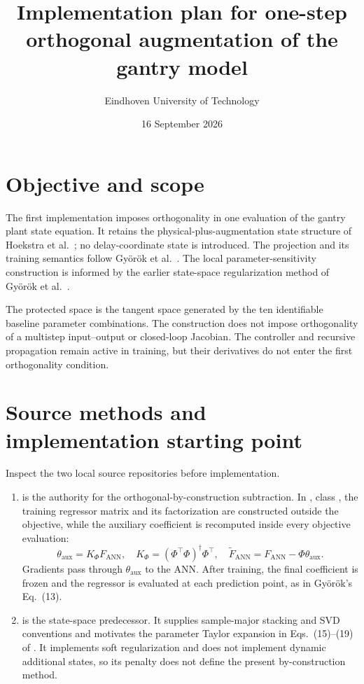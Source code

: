 \documentclass[11pt,a4paper]{article}
\title{Implementation plan for one-step orthogonal augmentation of the gantry model}
\author{Eindhoven University of Technology}
\date{16 September 2026}
\begin{document}
\maketitle

\section{Objective and scope}

The first implementation imposes orthogonality in one evaluation of the
gantry plant state equation. It retains the physical-plus-augmentation state
structure of Hoekstra et al.~\cite{hoekstra2025lfr,hoekstra2026fp}; no
delay-coordinate state is introduced. The projection and its training
semantics follow Gy\"or\"ok et al.~\cite{gyorok2026obc}. The local
parameter-sensitivity construction is informed by the earlier state-space
regularization method of Gy\"or\"ok et al.~\cite{gyorok2025l4dc}.

The protected space is the tangent space generated by the ten identifiable
baseline parameter combinations. The construction does not impose
orthogonality of a multistep input--output or closed-loop Jacobian. The
controller and recursive propagation remain active in training, but their
derivatives do not enter the first orthogonality condition.

\section{Source methods and implementation starting point}

Inspect the two local source repositories before implementation.
\begin{enumerate}
    \item {} is the authority for the
    orthogonal-by-construction subtraction. In
    , class
    , the training regressor matrix and its
    factorization are constructed outside the objective, while the auxiliary
    coefficient is recomputed inside every objective evaluation:
    \begin{equation}
        \theta_{\mathrm{aux}}=K_\Phi F_{\mathrm{ANN}},
        \quad K_\Phi=(\Phi^\top\Phi)^\dagger\Phi^\top,
        \quad \widetilde F_{\mathrm{ANN}}
        =F_{\mathrm{ANN}}-\Phi\theta_{\mathrm{aux}}.
        \label{eq:source-code-obc}
    \end{equation}
    Gradients pass through \(\theta_{\mathrm{aux}}\) to the ANN. After
    training, the final coefficient is frozen and the regressor is evaluated
    at each prediction point, as in Gy\"or\"ok's Eq.~(13).

    \item {} is the state-space predecessor.
    It supplies sample-major stacking and SVD conventions and motivates the
    parameter Taylor expansion in Eqs.~(15)--(19) of
    \cite{gyorok2025l4dc}. It implements soft regularization and does not
    implement dynamic additional states, so its penalty does not define the
    present by-construction method.
\end{enumerate}
\end{document}
